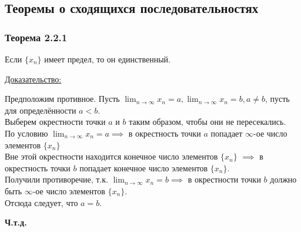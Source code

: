 \documentclass[12pt]{article}
\def\posl#1#2{\{#1_{#2}\}}
\begin{document}
    \subsection{Теоремы о сходящихся последовательностях}
    \subsubsection*{Теорема 2.2.1}\label{th:2.2.1}
    Если $\posl{x}{n}$ имеет предел, то он единственный.\par\noindent
    \underline{Доказательство:}
    \begin{adjustwidth}{1.5em}{1.5em}
        Предположим противное. Пусть $\lim_{n\to\infty}x_n = a, \lim_{n\to\infty}x_n = b, a \ne b$, пусть для определённости $a < b$.\\
        Выберем окрестности точки $a$ и $b$ таким образом, чтобы они не пересекались.\\
        По условию $\lim_{n\to\infty} x_n = a \implies$ в окрестность точки $a$ попадает $\infty$-ое число элементов $\posl{x}{n}$\\
        Вне этой окрестности находится конечное число элементов $\posl{x}{n}$ $\implies$ в окрестность точки $b$ попадает конечное число элементов $\posl{x}{n}$.\\
        Получили противоречие, т.к. $\lim_{n\to\infty}x_n = b \implies$ в окрестности точки $b$ должно быть $\infty$-ое число элементов $\posl{x}{n}$.\\
        Отсюда следует, что $a = b$.
        \begin{center}
            \textbf{Ч.т.д.}
        \end{center}    
    \end{adjustwidth}
\end{document}
